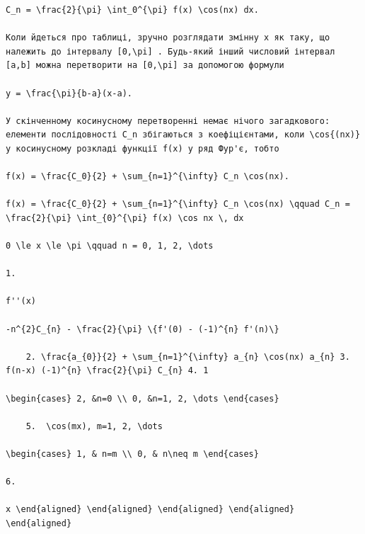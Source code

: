 \documentclass[
  ukrainian,
]{article}
\begin{document}
\begin{verbatim}
C_n = \frac{2}{\pi} \int_0^{\pi} f(x) \cos(nx) dx.

Коли йдеться про таблиці, зручно розглядати змінну x як таку, що належить до інтервалу [0,\pi] . Будь-який інший числовий інтервал [a,b] можна перетворити на [0,\pi] за допомогою формули

y = \frac{\pi}{b-a}(x-a).

У скінченному косинусному перетворенні немає нічого загадкового: елементи послідовності C_n збігаються з коефіцієнтами, коли \cos{(nx)} у косинусному розкладі функції f(x) у ряд Фур'є, тобто

f(x) = \frac{C_0}{2} + \sum_{n=1}^{\infty} C_n \cos(nx).

f(x) = \frac{C_0}{2} + \sum_{n=1}^{\infty} C_n \cos(nx) \qquad C_n = \frac{2}{\pi} \int_{0}^{\pi} f(x) \cos nx \, dx

0 \le x \le \pi \qquad n = 0, 1, 2, \dots

1.

f''(x)

-n^{2}C_{n} - \frac{2}{\pi} \{f'(0) - (-1)^{n} f'(n)\}

    2. \frac{a_{0}}{2} + \sum_{n=1}^{\infty} a_{n} \cos(nx) a_{n} 3. f(n-x) (-1)^{n} \frac{2}{\pi} C_{n} 4. 1

\begin{cases} 2, &n=0 \\ 0, &n=1, 2, \dots \end{cases}

    5.  \cos(mx), m=1, 2, \dots

\begin{cases} 1, & n=m \\ 0, & n\neq m \end{cases}

6.

x \end{aligned} \end{aligned} \end{aligned} \end{aligned} \end{aligned}
\end{verbatim}
\end{document}
